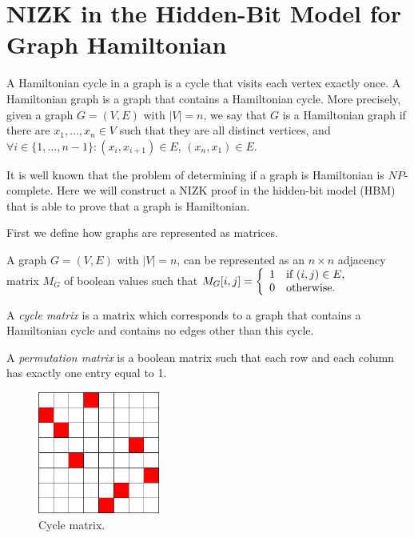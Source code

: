 





\section{NIZK in the Hidden-Bit Model for  Graph Hamiltonian}

\begin{definition}
A Hamiltonian cycle in a graph is a cycle that visits each vertex exactly once. A Hamiltonian graph is a graph that contains a Hamiltonian cycle. More precisely, given a graph
$G=(V,E)$ with $|V|=n$, we say that $G$ is a Hamiltonian graph if there are
$x_1,\ldots,x_n\in V$ such that they are all distinct vertices, and $\forall i\in\{1,\ldots,n-1\} : (x_i,x_{i+1})\in E$,
$(x_n,x_1)\in E$.
\end{definition}


It is well known that the problem of determining if a graph is Hamiltonian is $NP$-complete.
Here we will construct a NIZK proof in the hidden-bit model (HBM) that is able to prove
that a graph is Hamiltonian.

First we define how graphs are represented as matrices.

\begin{definition}
A graph $G=(V,E)$ with $|V|=n$, can be represented as an $n\times n$ adjacency matrix $M_G$
of boolean values such that
$M_G[i,j]=\left\{
\begin{array}{l l}
1 & \text{if $(i,j)\in E$,} \\
0 & \text{otherwise.}
\end{array}
\right.$

A \emph{cycle matrix} is a matrix which corresponds to a graph that contains a Hamiltonian cycle and
contains no edges other than this cycle.

A \emph{permutation matrix} is a boolean matrix such that each row and each column has exactly one
entry equal to 1.
\end{definition}

\begin{figure}[ht]
	\centering
		\includegraphics[height=4cm]{cycle.png}
	\caption{Cycle matrix.}
	\label{fig:cycle}
\end{figure}

